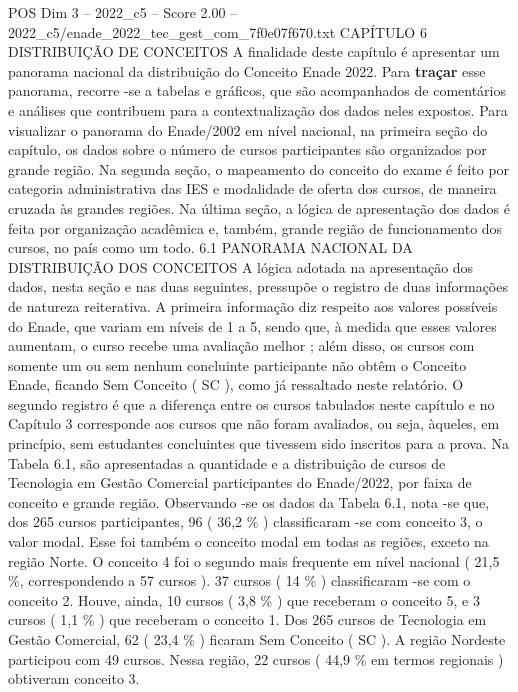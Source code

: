 \begin{textsample}{POS Dim 3 – 2022\_c5 – Score 2.00 – 2022\_c5/enade\_2022\_tec\_gest\_com\_7f0e07f670.txt}  \label{ex:f3_pos_063}
CAPÍTULO 6 DISTRIBUIÇÃO DE CONCEITOS A finalidade deste capítulo é apresentar um panorama nacional da distribuição do Conceito Enade 2022.
Para \textbf{traçar} esse panorama, recorre -se a tabelas e gráficos, que são acompanhados de comentários e análises que contribuem para a contextualização dos dados neles expostos.
Para visualizar o panorama do Enade/2002 em nível nacional, na primeira seção do capítulo, os dados sobre o número de cursos participantes são organizados por grande região.
Na segunda seção, o mapeamento do conceito do exame é feito por categoria administrativa das IES e modalidade de oferta dos cursos, de maneira cruzada às grandes regiões.
Na última seção, a lógica de apresentação dos dados é feita por organização acadêmica e, também, grande região de funcionamento dos cursos, no país como um todo. 6.1 PANORAMA NACIONAL DA DISTRIBUIÇÃO DOS CONCEITOS A lógica adotada na apresentação dos dados, nesta seção e nas duas seguintes, pressupõe o registro de duas informações de natureza reiterativa.
A primeira informação diz respeito aos valores possíveis do Enade, que variam em níveis de 1 a 5, sendo que, à medida que esses valores aumentam, o curso recebe uma avaliação melhor ; além disso, os cursos com somente um ou sem nenhum concluinte participante não obtêm o Conceito Enade, ficando Sem Conceito ( SC ), como já ressaltado neste relatório.
O segundo registro é que a diferença entre os cursos tabulados neste capítulo e no Capítulo 3 corresponde aos cursos que não foram avaliados, ou seja, àqueles, em princípio, sem estudantes concluintes que tivessem sido inscritos para a prova.
Na Tabela 6.1, são apresentadas a quantidade e a distribuição de cursos de Tecnologia em Gestão Comercial participantes do Enade/2022, por faixa de conceito e grande região.
Observando -se os dados da Tabela 6.1, nota -se que, dos 265 cursos participantes, 96 ( 36,2 \% ) classificaram -se com conceito 3, o valor modal.
Esse foi também o conceito modal em todas as regiões, exceto na região Norte.
O conceito 4 foi o segundo mais frequente em nível nacional ( 21,5 \%, correspondendo a 57 cursos ). 37 cursos ( 14 \% ) classificaram -se com o conceito 2.
Houve, ainda, 10 cursos ( 3,8 \% ) que receberam o conceito 5, e 3 cursos ( 1,1 \% ) que receberam o conceito 1.
Dos 265 cursos de Tecnologia em Gestão Comercial, 62 ( 23,4 \% ) ficaram Sem Conceito ( SC ).
A região Nordeste participou com 49 cursos.
Nessa região, 22 cursos ( 44,9 \% em termos regionais ) obtiveram conceito 3.

\end{textsample}
